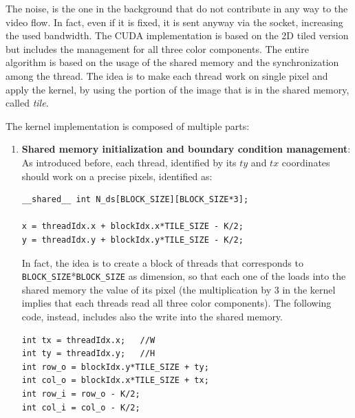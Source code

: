 \documentclass[paper=a4, fontsize=10pt]{scrartcl}	%
\begin{document}
	The noise, is the one in the background that do not contribute in any way to the video flow. In fact, even if it is fixed, it is sent anyway via the socket, increasing the used bandwidth. The CUDA implementation is based on the 2D tiled version but includes the management for all three color components.\newline\newline
	The entire algorithm is based on the usage of the shared memory and the synchronization among the thread. The idea is to make each thread work on single pixel and apply the kernel, by using the portion of the image that is in the shared memory, called \textit{tile}. 

	The kernel implementation is composed of multiple parts:
	\begin{enumerate}
		\itemsep0sp
		\item \textbf{Shared memory initialization and boundary condition management}:
		As introduced before, each thread, identified by its $ty$ and $tx$ coordinates should work on a precise pixels, identified as:
		\begin{lstlisting}[style=CStyle]
__shared__ int N_ds[BLOCK_SIZE][BLOCK_SIZE*3];

x = threadIdx.x + blockIdx.x*TILE_SIZE - K/2;
y = threadIdx.y + blockIdx.y*TILE_SIZE - K/2; \end{lstlisting}
	In fact, the idea is to create a block of threads that corresponds to \texttt{BLOCK\_SIZE}*\texttt{BLOCK\_SIZE} as dimension, so that each one of the loads into the shared memory the value of its pixel (the multiplication by 3 in the kernel implies that each threads read all three color components). The following code, instead, includes also the write into the shared memory.
		
		\begin{lstlisting}[style=CStyle]
int tx = threadIdx.x;   //W
int ty = threadIdx.y;   //H
int row_o = blockIdx.y*TILE_SIZE + ty;
int col_o = blockIdx.x*TILE_SIZE + tx;
int row_i = row_o - K/2;
int col_i = col_o - K/2;


\end{lstlisting}
\end{enumerate}
\end{document}
